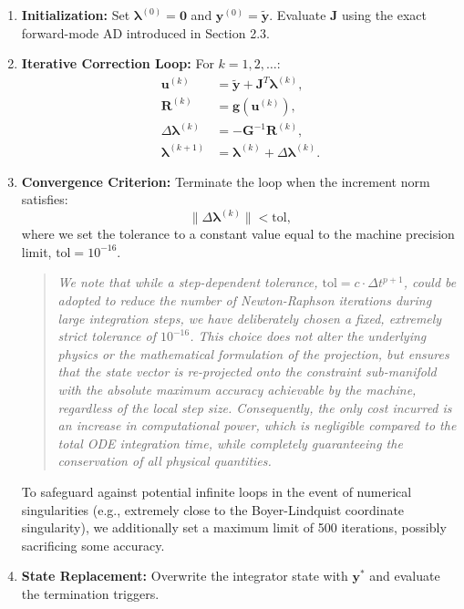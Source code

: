 \documentclass[11pt]{book}
\begin{document}
\begin{enumerate}
    \item \textbf{Initialization:} Set \(\bm{\lambda}^{(0)} = \bm{0}\) and \(\bm{y}^{(0)} = \tilde{\bm{y}}\). Evaluate \(\bm{J}\) using the exact forward-mode AD introduced in Section 2.3.
    \item \textbf{Iterative Correction Loop:} For \(k = 1, 2, \dots\):
    \begin{align}
        \bm{u}^{(k)} &= \tilde{\bm{y}} + \bm{J}^T \bm{\lambda}^{(k)}, \\
        \bm{R}^{(k)} &= \bm{g}(\bm{u}^{(k)}), \\
        \Delta \bm{\lambda}^{(k)} &= -\bm{G}^{-1} \bm{R}^{(k)}, \\
        \bm{\lambda}^{(k+1)} &= \bm{\lambda}^{(k)} + \Delta \bm{\lambda}^{(k)}.
    \end{align}
    \item \textbf{Convergence Criterion:} Terminate the loop when the increment norm satisfies:
    \begin{equation}
        \|\Delta \bm{\lambda}^{(k)}\| < \text{tol},
    \end{equation}
    where we set the tolerance to a constant value equal to the machine precision limit, \(\text{tol} = 10^{-16}\). 
    \begin{quote}
    \textit{We note that while a step-dependent tolerance, \(\text{tol} = c \cdot \Delta t^{p+1}\), could be adopted to reduce the number of Newton-Raphson iterations during large integration steps, we have deliberately chosen a fixed, extremely strict tolerance of \(10^{-16}\). This choice does not alter the underlying physics or the mathematical formulation of the projection, but ensures that the state vector is re-projected onto the constraint sub-manifold with the absolute maximum accuracy achievable by the machine, regardless of the local step size. Consequently, the only cost incurred is an increase in computational power, which is negligible compared to the total ODE integration time, while completely guaranteeing the conservation of all physical quantities.}
    \end{quote}
    To safeguard against potential infinite loops in the event of numerical singularities (e.g., extremely close to the Boyer-Lindquist coordinate singularity), we additionally set a maximum limit of 500 iterations, possibly sacrificing some accuracy.
    \item \textbf{State Replacement:} Overwrite the integrator state with \(\bm{y}^*\) and evaluate the termination triggers.
\end{enumerate}
\end{document}
